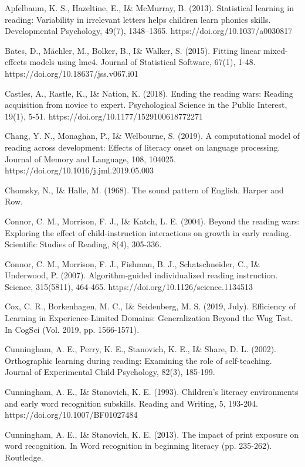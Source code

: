 \documentclass[
  ,man,floatsintext]{apa6}
\begin{document}
\begin{hangparas}{1.5em}{1}

Apfelbaum, K. S., Hazeltine, E., I\& McMurray, B. (2013). Statistical learning in reading: Variability in irrelevant letters helps children learn phonics skills. Developmental Psychology, 49(7), 1348–1365. https://doi.org/10.1037/a0030817

Bates, D., Mächler, M., Bolker, B., I\& Walker, S. (2015). Fitting linear mixed-effects models using lme4. Journal of Statistical Software, 67(1), 1-48. https://doi.org/10.18637/jss.v067.i01

Castles, A., Rastle, K., I\& Nation, K. (2018). Ending the reading wars: Reading acquisition from novice to expert. Psychological Science in the Public Interest, 19(1), 5-51. https://doi.org/10.1177/1529100618772271

Chang, Y. N., Monaghan, P., I\& Welbourne, S. (2019). A computational model of reading across development: Effects of literacy onset on language processing. Journal of Memory and Language, 108, 104025. https://doi.org/10.1016/j.jml.2019.05.003

Chomsky, N., I\& Halle, M. (1968). The sound pattern of English. Harper and Row.

Connor, C. M., Morrison, F. J., I\& Katch, L. E. (2004). Beyond the reading wars: Exploring the effect of child-instruction interactions on growth in early reading. Scientific Studies of Reading, 8(4), 305-336.

Connor, C. M., Morrison, F. J., Fishman, B. J., Schatschneider, C., I\& Underwood, P. (2007). Algorithm-guided individualized reading instruction. Science, 315(5811), 464-465. https://doi.org/10.1126/science.1134513

Cox, C. R., Borkenhagen, M. C., I\& Seidenberg, M. S. (2019, July). Efficiency of Learning in Experience-Limited Domains: Generalization Beyond the Wug Test. In CogSci (Vol. 2019, pp. 1566-1571).

Cunningham, A. E., Perry, K. E., Stanovich, K. E., I\& Share, D. L. (2002). Orthographic learning during reading: Examining the role of self-teaching. Journal of Experimental Child Psychology, 82(3), 185-199.

Cunningham, A. E., I\& Stanovich, K. E. (1993). Children's literacy environments and early word recognition subskills. Reading and Writing, 5, 193-204. https://doi.org/10.1007/BF01027484

Cunningham, A. E., I\& Stanovich, K. E. (2013). The impact of print exposure on word recognition. In Word recognition in beginning literacy (pp. 235-262). Routledge.


\end{hangparas}
\end{document}
